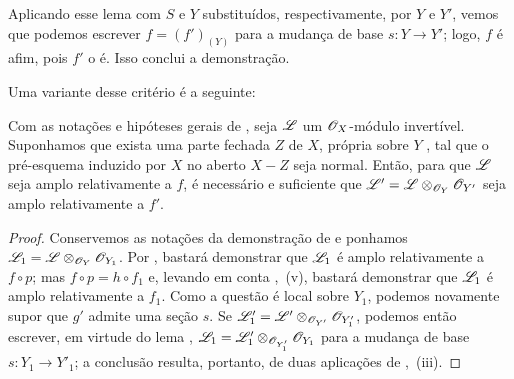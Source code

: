 Aplicando esse lema com $S$ e $Y$ substituídos, respectivamente, por $Y$ e $Y'$, vemos que podemos escrever $f=(f')_{(Y)}$ para a mudança de base $s:Y\to Y'$; logo, $f$ é afim, pois $f'$ o é.
Isso conclui a demonstração.

Uma variante desse critério é a seguinte:

\begin{corollary}[14.5.12]
\label{IV.14.5.12}
Com as notações e hipóteses gerais de , seja $\mathscr{L}$ um $\mathscr{O}_X$-módulo invertível.
Suponhamos que exista uma parte fechada $Z$ de $X$, própria sobre $Y$ , tal que o pré-esquema induzido por $X$ no aberto $X-Z$ seja normal.
Então, para que $\mathscr{L}$ seja amplo relativamente a $f$, é necessário e suficiente que $\mathscr{L}'=\mathscr{L}\otimes_{\mathscr{O}_Y}\mathscr{O}_{Y'}$ seja amplo relativamente a $f'$.
\end{corollary}

\begin{proof}
Conservemos as notações da demonstração de  e ponhamos $\mathscr{L}_1=\mathscr{L}\otimes_{\mathscr{O}_Y}\mathscr{O}_{Y_1}$.
Por , bastará demonstrar que $\mathscr{L}_1$ é amplo relativamente a $f\circ p$; mas $f\circ p=h\circ f_1$ e, levando em conta ,~(v), bastará demonstrar que $\mathscr{L}_1$ é amplo relativamente a $f_1$.
Como a questão é local sobre $Y_1$, podemos novamente supor que $g'$ admite uma seção $s$.
Se $\mathscr{L}'_1=\mathscr{L}'\otimes_{\mathscr{O}_{Y'}}\mathscr{O}_{Y'_1}$, podemos então escrever, em virtude do lema , $\mathscr{L}_1=\mathscr{L}'_1\otimes_{\mathscr{O}_{Y'_1}}\mathscr{O}_{Y_1}$ para a mudança de base $s:Y_1\to Y'_1$; a conclusão resulta, portanto, de duas aplicações de ,~(iii).
\end{proof}

